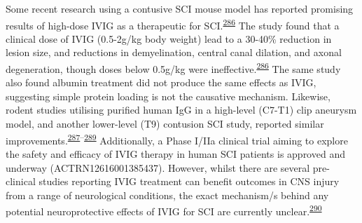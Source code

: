 \documentclass[
]{article}
\begin{document}
Some recent research using a contusive SCI mouse model has reported promising results of high-dose IVIG as a therapeutic for SCI.\textsuperscript{\protect\hyperlink{ref-brennan_ivig_2016}{286}}
The study found that a clinical dose of IVIG (0.5-2g/kg body weight) lead to a 30-40\% reduction in lesion size, and reductions in demyelination, central canal dilation, and axonal degeneration, though doses below 0.5g/kg were ineffective.\textsuperscript{\protect\hyperlink{ref-brennan_ivig_2016}{286}}
The same study also found albumin treatment did not produce the same effects as IVIG, suggesting simple protein loading is not the causative mechanism.
Likewise, rodent studies utilising purified human IgG in a high-level (C7-T1) clip aneurysm model, and another lower-level (T9) contusion SCI study, reported similar improvements.\textsuperscript{\protect\hyperlink{ref-nguyen_immunoglobulin_2012}{287}--\protect\hyperlink{ref-gok_immunomodulation_2009}{289}}
Additionally, a Phase I/IIa clinical trial aiming to explore the safety and efficacy of IVIG therapy in human SCI patients is approved and underway (ACTRN12616001385437).
However, whilst there are several pre-clinical studies reporting IVIG treatment can benefit outcomes in CNS injury from a range of neurological conditions, the exact mechanism/s behind any potential neuroprotective effects of IVIG for SCI are currently unclear.\textsuperscript{\protect\hyperlink{ref-tzekou_treatment_2014}{290}}
\end{document}
